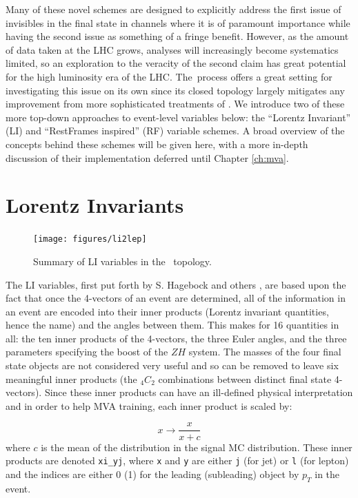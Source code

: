 Many of these novel schemes are designed to explicitly address the first issue of invisibles in the final state in channels where it is of paramount importance while having the second issue as something of a fringe benefit.  However, as the amount of data taken at the LHC grows, analyses will increasingly become systematics limited, so an exploration to the veracity of the second claim has great potential for the high luminosity era of the LHC.  The \ZH\,process offers a great setting for investigating this issue on its own since its closed topology largely mitigates any improvement from more sophisticated treatments of \met.  We introduce two of these more top-down approaches to event-level variables below: the ``Lorentz Invariant'' (LI) \cite{litalk} and ``RestFrames inspired'' (RF) \cite{rjr} variable schemes.  A broad overview of the concepts behind these schemes will be given here, with a more in-depth discussion of their implementation deferred until Chapter \ref{ch:mva}.


\section{Lorentz Invariants}
\begin{figure}[!htbp]\captionsetup{justification=centering}
  \centering
  \texttt{[image: figures/li2lep]}
  \caption{Summary of LI variables in the \ZH\, topology.}
  \label{fig:li}
\end{figure}
  The LI variables, first put forth by S. Hagebock and others \cite{litalk}, are based upon the fact that once the 4-vectors of an event are determined, all of the information in an event are encoded into their inner products (Lorentz invariant quantities, hence the name) and the angles between them.  This makes for 16 quantities in all: the ten inner products of the 4-vectors, the three Euler angles, and the three parameters specifying the boost of the $ZH$ system.  The masses of the four final state objects are not considered very useful and so can be removed to leave six meaningful inner products (the $_4C_2$ combinations between distinct final state 4-vectors).  Since these inner products can have an ill-defined physical interpretation and in order to help MVA training, each inner product is scaled by:

\begin{equation}
\label{eqn:liip}
x\to\frac{x}{x+c}
\end{equation}
where $c$ is the mean of the distribution in the signal MC distribution.  These inner products are denoted \texttt{xi\_yj}, where \texttt{x} and \texttt{y} are either \texttt{j} (for jet) or \texttt{l} (for lepton) and the indices are either 0 (1) for the leading (subleading) object by $p_T$ in the event.

